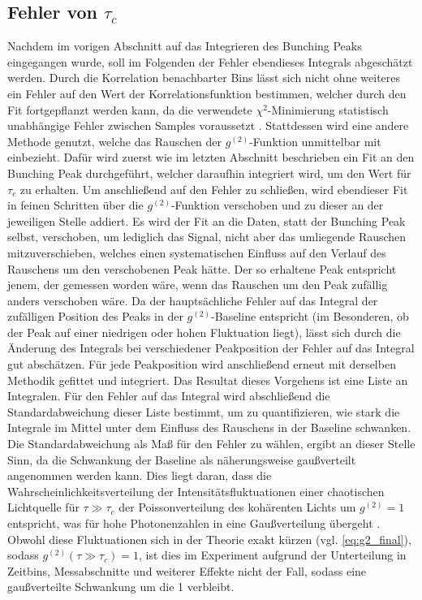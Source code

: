 \subsection{Fehler von \texorpdfstring{$\tau_c$}{tc}}
\label{ssec:Fehler von tau_c}
Nachdem im vorigen Abschnitt auf das Integrieren des Bunching Peaks eingegangen wurde, soll im Folgenden der Fehler ebendieses Integrals abgeschätzt werden. 
Durch die Korrelation benachbarter Bins lässt sich nicht ohne weiteres ein Fehler auf den Wert der Korrelationsfunktion bestimmen, welcher durch den Fit fortgepflanzt werden kann, da die verwendete $\chi^2$-Minimierung statistisch unabhängige Fehler zwischen Samples voraussetzt \cite{vugrinConfidenceRegionEstimation2007}. 
Stattdessen wird eine andere Methode genutzt, welche das Rauschen der $g^{(2)}$-Funktion unmittelbar mit einbezieht. 
Dafür wird zuerst wie im letzten Abschnitt beschrieben ein Fit an den Bunching Peak durchgeführt, welcher daraufhin integriert wird, um den Wert für $\tau_c$ zu erhalten. 
Um anschließend auf den Fehler zu schließen, wird ebendieser Fit in feinen Schritten über die $g^{(2)}$-Funktion verschoben und zu dieser an der jeweiligen Stelle addiert. 
Es wird der Fit an die Daten, statt der Bunching Peak selbst, verschoben, um lediglich das Signal, nicht aber das umliegende Rauschen mitzuverschieben, welches einen systematischen Einfluss auf den Verlauf des Rauschens um den verschobenen Peak hätte. 
Der so erhaltene Peak entspricht jenem, der gemessen worden wäre, wenn das Rauschen um den Peak zufällig anders verschoben wäre. 
Da der hauptsächliche Fehler auf das Integral der zufälligen Position des Peaks in der $g^{(2)}$-Baseline entspricht (im Besonderen, ob der Peak auf einer niedrigen oder hohen Fluktuation liegt), lässt sich durch die Änderung des Integrals bei verschiedener Peakposition der Fehler auf das Integral gut abschätzen. 
Für jede Peakposition wird anschließend erneut mit derselben Methodik gefittet und integriert. 
Das Resultat dieses Vorgehens ist eine Liste an Integralen. 
Für den Fehler auf das Integral wird abschließend die Standardabweichung dieser Liste bestimmt, um zu quantifizieren, wie stark die Integrale im Mittel unter dem Einfluss des Rauschens in der Baseline schwanken. 
Die Standardabweichung als Maß für den Fehler zu wählen, ergibt an dieser Stelle Sinn, da die Schwankung der Baseline als näherungsweise gaußverteilt angenommen werden kann. 
Dies liegt daran, dass die Wahrscheinlichkeitsverteilung der Intensitätsfluktuationen einer chaotischen Lichtquelle für $\tau\gg \tau_c$ der Poissonverteilung des kohärenten Lichts um $g^{(2)}=1$ entspricht, was für hohe Photonenzahlen in eine Gaußverteilung übergeht \cite[Kap. 5.5]{foxQuantumOpticsIntroduction2006}.
Obwohl diese Fluktuationen sich in der Theorie exakt kürzen (vgl. \autoref{eq:g2_final}), sodass $g^{(2)}(\tau \gg \tau_c) = 1$, ist dies im Experiment aufgrund der Unterteilung in Zeitbins, Messabschnitte und weiterer Effekte nicht der Fall, sodass eine gaußverteilte Schwankung um die 1 verbleibt.  \\

